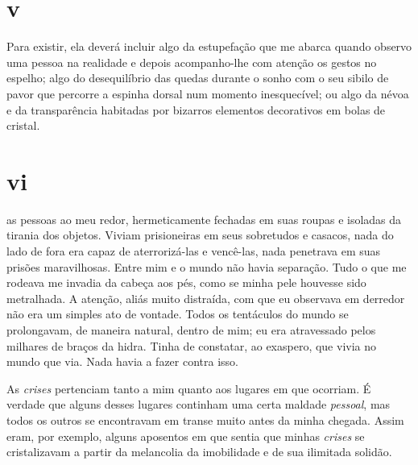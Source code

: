 \section{v} 

 

Para existir, ela deverá incluir algo da estupefação que me abarca quando
observo uma pessoa na realidade e depois acompanho-lhe com atenção os gestos
no espelho; algo do desequilíbrio das quedas durante o sonho com o seu sibilo
de pavor que percorre a espinha dorsal num momento inesquecível; ou algo da
névoa e da transparência habitadas por bizarros elementos decorativos em
bolas de cristal.


\section{vi} 

 as pessoas ao meu redor, hermeticamente fechadas em suas
 roupas e isoladas da tirania dos objetos. Viviam prisioneiras em seus
 sobretudos e casacos, nada do lado de fora era capaz de aterrorizá-las e
 vencê-las, nada penetrava em suas prisões maravilhosas. Entre mim e o mundo
 não havia separação. Tudo o que me rodeava me invadia da cabeça aos pés,
 como se minha pele houvesse sido metralhada. A atenção, aliás muito
 distraída, com que eu observava em derredor não era um simples ato de
 vontade. Todos os tentáculos do mundo se prolongavam, de maneira natural,
 dentro de mim; eu era atravessado pelos milhares de braços da hidra. Tinha
 de constatar, ao exaspero, que vivia no mundo que via. Nada havia a fazer
 contra isso.

As \textit{crises} pertenciam tanto a mim quanto aos lugares em que ocorriam.
É verdade que alguns desses lugares continham uma certa maldade \textit
{pessoal}, mas todos os outros se encontravam em transe muito antes da minha
chegada. Assim eram, por exemplo, alguns aposentos em que sentia que
minhas \textit{crises} se cristalizavam a partir da melancolia da imobilidade
e de sua ilimitada solidão.


